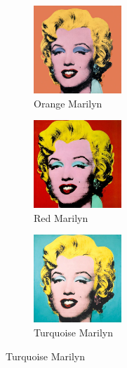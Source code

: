 \documentclass{article}
\begin{document}
\begin{figure}[ht]
  \centering
  \begin{subfigure}{0.3\textwidth}
    \centering
    \includegraphics[width=125px]{main_files/figure-latex/1_1_orange_marilyn.jpg}
    \caption{Orange Marilyn}
    \label{fig:1_1_orange_marilyn}
  \end{subfigure}
  \hfill
  \begin{subfigure}{0.3\textwidth}
    \centering
    \includegraphics[width=125px]{main_files/figure-latex/1_2_red_marilyn.jpg}
    \caption{Red Marilyn}
    \label{fig:1_2_red_marilyn}
  \end{subfigure}
  \hfill
  \begin{subfigure}{0.3\textwidth}
    \centering
    \includegraphics[width=125px]{main_files/figure-latex/1_3_turq_marilyn.jpg}
    \caption{Turquoise Marilyn}
    \label{fig:1_3_turq_marilyn}
  \end{subfigure}

  \vspace{1em}


\end{figure}
\end{document}
